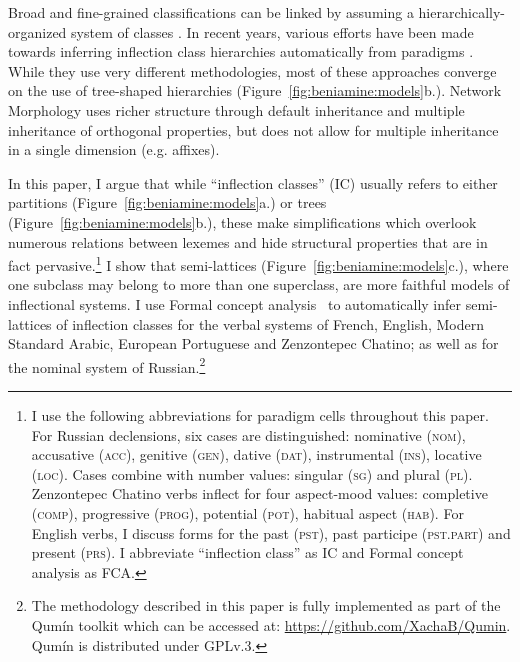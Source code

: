 \documentclass[output=paper]{langscibook}
\begin{document}
    Broad and fine-grained classifications can be linked by assuming
    a hierarchic\-ally-organized system of classes
    \citep{CorbettFraser1993,DresslerThornton1996}. In recent years,
    various efforts have been made towards inferring inflection class
    hierarchies automatically from paradigms
    \citep{BrownHippisley2012,LeeGoldsmith2013,Bonamihdr}. While they
    use very different methodologies, most of these approaches
    converge on the use of tree-shaped hierarchies
    (Figure~\ref{fig:beniamine:models}b.). Network Morphology
    \citep{CorbettFraser1993,BrownHippisley2012} uses richer structure
    through default inheritance and multiple inheritance of orthogonal
    properties, but does not allow for multiple inheritance in a
    single dimension (e.g. affixes).
    
    In this paper, I argue that while ``inflection classes'' (IC) usually refers to either partitions (Figure~\ref{fig:beniamine:models}a.) or trees (Figure~\ref{fig:beniamine:models}b.), these make simplifications which overlook numerous relations between lexemes and hide structural properties that are in fact pervasive.\footnote{I use the following abbreviations for paradigm cells throughout this paper. For Russian declensions, six cases are distinguished: nominative (\textsc{nom}),  accusative (\textsc{acc}), genitive (\textsc{gen}), dative (\textsc{dat}),  instrumental (\textsc{ins}), locative (\textsc{loc}). Cases combine with number values: singular (\textsc{sg}) and plural (\textsc{pl}). Zenzontepec Chatino verbs inflect for four aspect-mood values: completive (\textsc{comp}), progressive (\textsc{prog}), potential (\textsc{pot}), habitual aspect (\textsc{hab}). For English verbs, I discuss forms for the past (\textsc{pst}), past participe (\textsc{pst.part}) and present (\textsc{prs}). I abbreviate ``inflection class'' as IC and Formal concept analysis as FCA.} I show that semi-lattices (Figure~\ref{fig:beniamine:models}c.), where one subclass may belong to more than one superclass, are more faithful models of inflectional systems. I use Formal concept analysis~\citep[][hereafter FCA]{GanterWille1998} to automatically infer semi-lattices of inflection classes for the verbal systems of French, English, Modern Standard Arabic, European Portuguese and Zenzontepec Chatino; as well as for the nominal system of Russian.\footnote{The methodology described in this paper is fully implemented as part of the Qumín toolkit \citep{BeniaminePhd} which can be accessed at: \url{https://github.com/XachaB/Qumin}. Qumín is distributed under GPLv.3.}
    
\end{document}
